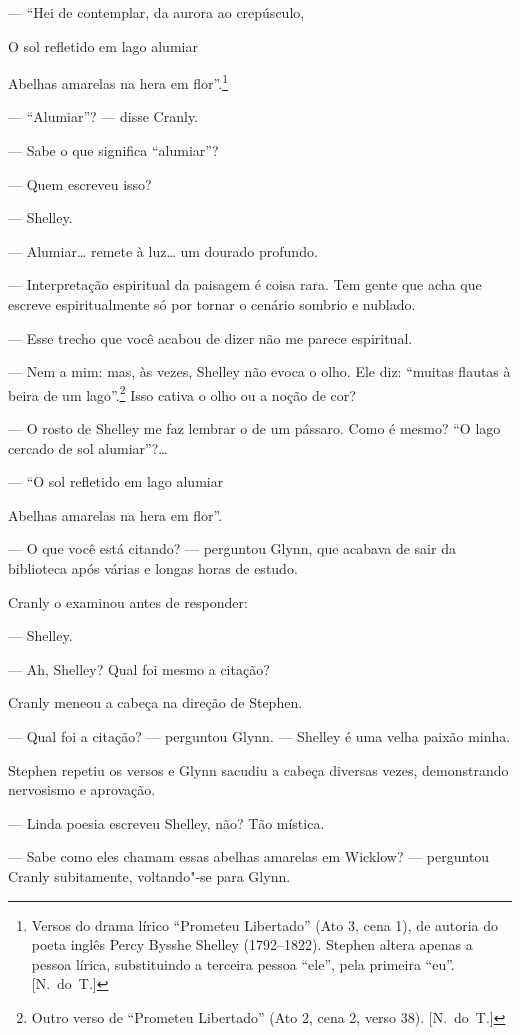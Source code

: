 --- “Hei de contemplar, da aurora ao crepúsculo,

O sol refletido em lago alumiar

Abelhas amarelas na hera em flor”.\footnote{ Versos do drama lírico “Prometeu
Libertado” (Ato 3, cena 1), de autoria do poeta inglês Percy Bysshe Shelley
(1792--1822). Stephen altera apenas a pessoa lírica, substituindo a terceira
pessoa “ele”, pela primeira “eu”. [N.~do~T.]}

--- “Alumiar”? --- disse Cranly.

--- Sabe o que significa “alumiar”?

--- Quem escreveu isso?

--- Shelley.

--- Alumiar\ldots{} remete à luz\ldots{} um dourado profundo.

--- Interpretação espiritual da paisagem é coisa rara.  Tem gente que acha que
escreve espiritualmente só por tornar o cenário sombrio e nublado.

--- Esse trecho que você acabou de dizer não me parece espiritual.

--- Nem a mim: mas, às vezes, Shelley não evoca o olho.  Ele diz: “muitas
flautas à beira de um lago”.\footnote[\setcounter{symbol}{2}]{ Outro verso de “Prometeu Libertado” (Ato
2, cena 2, verso 38). [N.~do~T.]}  Isso cativa o olho ou a noção de cor?

--- O rosto de Shelley me faz lembrar o de um pássaro.  Como é mesmo?  “O lago
cercado de sol alumiar”?\ldots{}

--- “O sol refletido em lago alumiar

Abelhas amarelas na hera em flor”.

--- O que você está citando? --- perguntou Glynn, que acabava de sair da
biblioteca após várias e longas horas de estudo.

Cranly o examinou antes de responder:

--- Shelley.

--- Ah, Shelley?  Qual foi mesmo a citação?

Cranly meneou a cabeça na direção de Stephen.

--- Qual foi a citação? --- perguntou Glynn.  --- Shelley é uma velha paixão
minha.

Stephen repetiu os versos e Glynn sacudiu a cabeça diversas vezes, demonstrando
nervosismo e aprovação.

--- Linda poesia escreveu Shelley, não?  Tão mística.

--- Sabe como eles chamam essas abelhas amarelas em Wicklow? --- perguntou		
Cranly subitamente, voltando"-se para Glynn.

